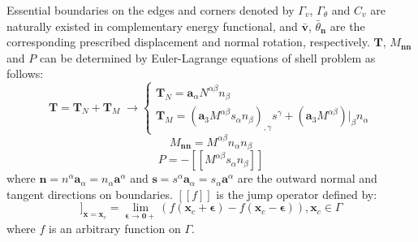 Essential boundaries on the edges and corners denoted by $\Gamma_v$, $\Gamma_\theta$ and $C_v$ are naturally existed in complementary energy functional, and $\bar{\boldsymbol v}$, $\bar \theta_{\boldsymbol n}$ are the corresponding prescribed displacement and normal rotation, respectively. $\boldsymbol T$, $M_{\boldsymbol{nn}}$ and $P$ can be determined by Euler-Lagrange equations of shell problem \cite{benzaken2021} as follows:
\begin{equation}
\boldsymbol T = \boldsymbol T_N + \boldsymbol T_M \; \rightarrow
\begin{cases}
\boldsymbol T_N = \boldsymbol a_\alpha N^{\alpha\beta}n_\beta \\
\boldsymbol T_M = (\boldsymbol a_3 M^{\alpha\beta}s_\alpha n_\beta)_{,\gamma} s^\gamma
+ (\boldsymbol a_3 M^{\alpha\beta})\vert_\beta n_\alpha
\end{cases}
\end{equation}
\begin{equation}
M_{\boldsymbol{nn}} = M^{\alpha\beta}n_\alpha n_\beta
\end{equation}
\begin{equation}
P = -[[M^{\alpha\beta}s_\alpha n_\beta]]
\end{equation}
where $\boldsymbol n = n^\alpha \boldsymbol a_\alpha = n_\alpha \boldsymbol a^\alpha$ and $\boldsymbol s = s^\alpha \boldsymbol a_\alpha = s_\alpha \boldsymbol a^\alpha$ are the outward normal and tangent directions on boundaries. $[[f]]$ is the jump operator defined by:
\begin{equation}
[[f]]_{\boldsymbol x = \boldsymbol x_c} = \lim_{\boldsymbol \epsilon\rightarrow \boldsymbol 0+}(f(\boldsymbol x_c + \boldsymbol \epsilon) - f(\boldsymbol x_c - \boldsymbol \epsilon)), \boldsymbol x_c \in \Gamma
\end{equation}
where $f$ is an arbitrary function on $\Gamma$.

